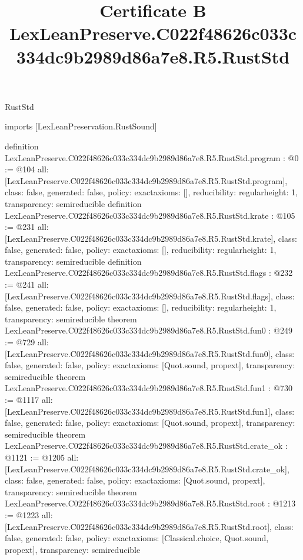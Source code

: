 \begin{lexlean}{RustStd}
\title{Certificate B LexLeanPreserve.C022f48626c033c334dc9b2989d86a7e8.R5.RustStd}
\begin{coremodule}
imports [LexLeanPreservation.RustSound]

definition LexLeanPreserve.C022f48626c033c334dc9b2989d86a7e8.R5.RustStd.program : @0 := @104 {
  all: [LexLeanPreserve.C022f48626c033c334dc9b2989d86a7e8.R5.RustStd.program],
  class: false,
  generated: false,
  policy: exact{axioms: []},
  reducibility: regular{height: 1},
  transparency: semireducible
}
definition LexLeanPreserve.C022f48626c033c334dc9b2989d86a7e8.R5.RustStd.krate : @105 := @231 {
  all: [LexLeanPreserve.C022f48626c033c334dc9b2989d86a7e8.R5.RustStd.krate],
  class: false,
  generated: false,
  policy: exact{axioms: []},
  reducibility: regular{height: 1},
  transparency: semireducible
}
definition LexLeanPreserve.C022f48626c033c334dc9b2989d86a7e8.R5.RustStd.flags : @232 := @241 {
  all: [LexLeanPreserve.C022f48626c033c334dc9b2989d86a7e8.R5.RustStd.flags],
  class: false,
  generated: false,
  policy: exact{axioms: []},
  reducibility: regular{height: 1},
  transparency: semireducible
}
theorem LexLeanPreserve.C022f48626c033c334dc9b2989d86a7e8.R5.RustStd.fun0 : @249 := @729 {
  all: [LexLeanPreserve.C022f48626c033c334dc9b2989d86a7e8.R5.RustStd.fun0],
  class: false,
  generated: false,
  policy: exact{axioms: [Quot.sound, propext]},
  transparency: semireducible
}
theorem LexLeanPreserve.C022f48626c033c334dc9b2989d86a7e8.R5.RustStd.fun1 : @730 := @1117 {
  all: [LexLeanPreserve.C022f48626c033c334dc9b2989d86a7e8.R5.RustStd.fun1],
  class: false,
  generated: false,
  policy: exact{axioms: [Quot.sound, propext]},
  transparency: semireducible
}
theorem LexLeanPreserve.C022f48626c033c334dc9b2989d86a7e8.R5.RustStd.crate_ok : @1121 := @1205 {
  all: [LexLeanPreserve.C022f48626c033c334dc9b2989d86a7e8.R5.RustStd.crate_ok],
  class: false,
  generated: false,
  policy: exact{axioms: [Quot.sound, propext]},
  transparency: semireducible
}
theorem LexLeanPreserve.C022f48626c033c334dc9b2989d86a7e8.R5.RustStd.root : @1213 := @1223 {
  all: [LexLeanPreserve.C022f48626c033c334dc9b2989d86a7e8.R5.RustStd.root],
  class: false,
  generated: false,
  policy: exact{axioms: [Classical.choice, Quot.sound, propext]},
  transparency: semireducible
}


\end{coremodule}
\end{lexlean}
